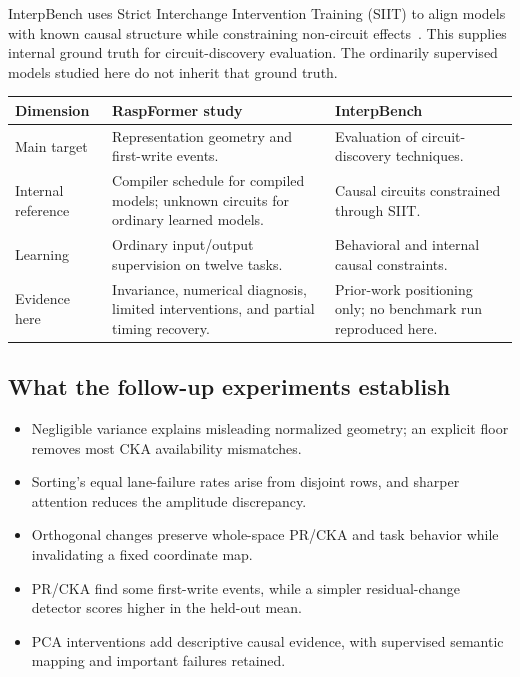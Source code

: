 \documentclass[11pt,a4paper]{article}
\begin{document}
InterpBench uses Strict Interchange Intervention Training (SIIT) to align models with known causal structure while constraining non-circuit effects~\cite{interpbench}. This supplies internal ground truth for circuit-discovery evaluation. The ordinarily supervised models studied here do not inherit that ground truth.

\begin{center}\small
\begin{tabularx}{\linewidth}{@{}P{.20\linewidth}XX@{}}
\toprule
\textbf{Dimension} & \textbf{RaspFormer study} & \textbf{InterpBench}\\
\midrule
Main target & Representation geometry and first-write events. & Evaluation of circuit-discovery techniques.\\
Internal reference & Compiler schedule for compiled models; unknown circuits for ordinary learned models. & Causal circuits constrained through SIIT.\\
Learning & Ordinary input/output supervision on twelve tasks. & Behavioral and internal causal constraints.\\
Evidence here & Invariance, numerical diagnosis, limited interventions, and partial timing recovery. & Prior-work positioning only; no benchmark run reproduced here.\\
\bottomrule
\end{tabularx}\end{center}

\subsection*{What the follow-up experiments establish}
\begin{itemize}
\item Negligible variance explains misleading normalized geometry; an explicit floor removes most CKA availability mismatches.
\item Sorting's equal lane-failure rates arise from disjoint rows, and sharper attention reduces the amplitude discrepancy.
\item Orthogonal changes preserve whole-space PR/CKA and task behavior while invalidating a fixed coordinate map.
\item PR/CKA find some first-write events, while a simpler residual-change detector scores higher in the held-out mean.
\item PCA interventions add descriptive causal evidence, with supervised semantic mapping and important failures retained.
\end{itemize}
\end{document}
